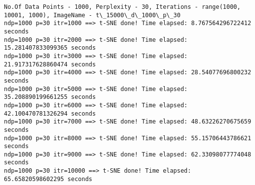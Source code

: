 \documentclass[11pt]{article}
\begin{document}
    \begin{Verbatim}[commandchars=\\\{\}]
No.Of Data Points - 1000, Perplexity - 30, Iterations - range(1000, 10001, 1000), ImageName - t\_15000\_d\_1000\_p\_30
ndp=1000 p=30 itr=1000 ==> t-SNE done! Time elapsed: 8.767564296722412 seconds
ndp=1000 p=30 itr=2000 ==> t-SNE done! Time elapsed: 15.281407833099365 seconds
ndp=1000 p=30 itr=3000 ==> t-SNE done! Time elapsed: 21.917317628860474 seconds
ndp=1000 p=30 itr=4000 ==> t-SNE done! Time elapsed: 28.54077696800232 seconds
ndp=1000 p=30 itr=5000 ==> t-SNE done! Time elapsed: 35.208890199661255 seconds
ndp=1000 p=30 itr=6000 ==> t-SNE done! Time elapsed: 42.100470781326294 seconds
ndp=1000 p=30 itr=7000 ==> t-SNE done! Time elapsed: 48.63226270675659 seconds
ndp=1000 p=30 itr=8000 ==> t-SNE done! Time elapsed: 55.15706443786621 seconds
ndp=1000 p=30 itr=9000 ==> t-SNE done! Time elapsed: 62.33098077774048 seconds
ndp=1000 p=30 itr=10000 ==> t-SNE done! Time elapsed: 65.65820598602295 seconds

    \end{Verbatim}

    \begin{center}
    \end{center}
    { \hspace*{\fill} \\}
    
    \begin{center}
    \end{center}
    { \hspace*{\fill} \\}
    
    \begin{center}
    \end{center}
    { \hspace*{\fill} \\}
    
    \begin{center}
    \end{center}
    { \hspace*{\fill} \\}
    
    \begin{center}
    \end{center}
    { \hspace*{\fill} \\}
    
\end{document}
